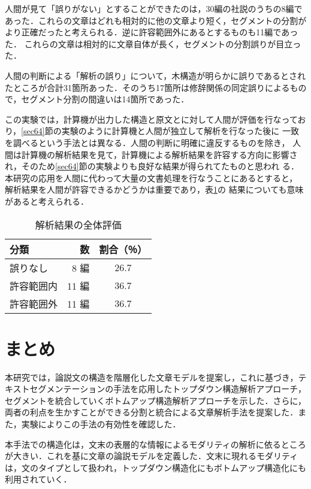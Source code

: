 人間が見て「誤りがない」とすることができたのは，30編の社説のうちの8編で
あった．これらの文章はどれも相対的に他の文章より短く，セグメントの分割が
より正確だったと考えられる．逆に許容範囲外にあるとするものも11編であった．
これらの文章は相対的に文章自体が長く，セグメントの分割誤りが目立った．

人間の判断による「解析の誤り」について，木構造が明らかに誤りであるとされ
たところが合計31箇所あった．そのうち17箇所は修辞関係の同定誤りによるもの
で，セグメント分割の間違いは14箇所であった．

この実験では，計算機が出力した構造と原文とに対して人間が評価を行なってお
り，\ref{sec64}節の実験のように計算機と人間が独立して解析を行なった後に
一致を調べるという手法とは異なる．人間の判断に明確に違反するものを除き，
人間は計算機の解析結果を見て，計算機による解析結果を許容する方向に影響さ
れ，そのため\ref{sec64}節の実験よりも良好な結果が得られてたものと思われ
る．本研究の応用を人間に代わって大量の文書処理を行なうことにあるとすると，
解析結果を人間が許容できるかどうかは重要であり，表\ref{kaiseki_kekka}の
結果についても意味があると考えられる．

\begin{table}[htb]
  \begin{center}
   \begin{tabular}{|l|r|c|} \hline
    分類     &   数 & 割合（％）\\ \hline
    誤りなし & 8 編 & 26.7 \\ \hline
    許容範囲内 & 11 編 & 36.7 \\ \hline
    許容範囲外 & 11 編 & 36.7\\
    \hline
   \end{tabular}
  \end{center}
 \caption{解析結果の全体評価}
 \label{kaiseki_kekka}
\end{table}


\section{まとめ}

本研究では，論説文の構造を階層化した文章モデルを提案し，これに基づき，テ
キストセグメンテーションの手法を応用したトップダウン構造解析アプローチ，
セグメントを統合していくボトムアップ構造解析アプローチを示した．さらに，
両者の利点を生かすことができる分割と統合による文章解析手法を提案した．ま
た，実験によりこの手法の有効性を確認した．

本手法での構造化は，文末の表層的な情報によるモダリティの解析に依るところ
が大きい．これを基に文章の論説モデルを定義した．文末に現れるモダリティ
は，文のタイプとして扱われ，トップダウン構造化にもボトムアップ構造化にも
利用されていく．

